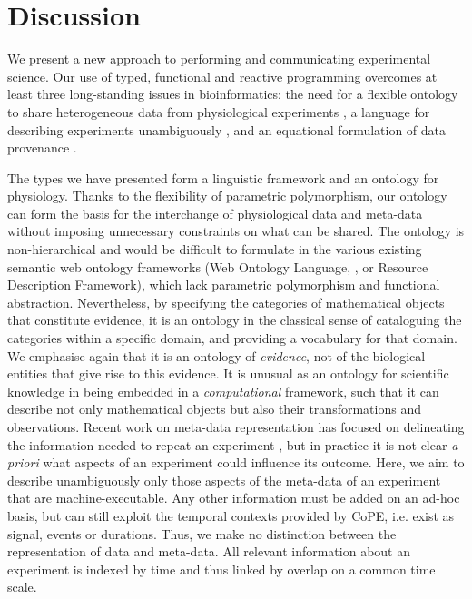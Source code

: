 \section*{Discussion}

We present a new approach to performing and communicating
experimental science.  Our use of
typed, functional and reactive programming overcomes at least three
long-standing issues in bioinformatics: the need for a flexible
ontology to share heterogeneous data from physiological experiments
\citep{Amari2002}, a language for describing experiments unambiguously
\citep{Murray-Rust2002}, and an equational formulation of data
provenance \citep{Pool2002}. 

The types we have presented form a linguistic framework and an
ontology for physiology. Thanks to the flexibility of parametric
polymorphism, our ontology can form the basis for the interchange of
physiological data and meta-data without imposing unnecessary
constraints on what can be shared. The ontology is non-hierarchical
and would be difficult to formulate in the various existing semantic
web ontology frameworks (Web Ontology Language, \citep{owlref}, or
Resource Description Framework), which lack parametric polymorphism
and functional abstraction. Nevertheless, by specifying the categories
of mathematical objects that constitute evidence, it is an ontology in
the classical sense of cataloguing the categories within a specific
domain, and providing a vocabulary for that domain. We emphasise again
that it is an ontology of \emph{evidence}, not of the biological
entities that give rise to this evidence. It is unusual as an ontology
for scientific knowledge in being embedded in a \emph{computational}
framework, such that it can describe not only mathematical objects but
also their transformations and observations. Recent work on meta-data
\citep{Bower2009} representation has focused on delineating the
information needed to repeat an experiment \citep{Taylor2007,
  Gibson2008}, but in practice it is not clear \emph{a priori} what
aspects of an experiment could influence its outcome. Here, we aim to
describe unambiguously only those aspects of the meta-data of an
experiment that are machine-executable. Any other information must be
added on an ad-hoc basis, but can still exploit the temporal contexts
provided by CoPE, i.e. exist as signal, events or durations. Thus, we
make no distinction between the representation of data and
meta-data. All relevant information about an experiment is indexed by
time and thus linked by overlap on a common time scale.

